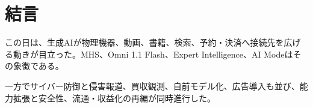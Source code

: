 \section{結言}
この日は、生成AIが物理機器、動画、書籍、検索、予約・決済へ接続先を広げる動きが目立った。MHS、Omni 1.1 Flash、Expert Intelligence、AI Modeはその象徴である。

一方でサイバー防御と侵害報道、買収観測、自前モデル化、広告導入も並び、能力拡張と安全性、流通・収益化の再編が同時進行した。
